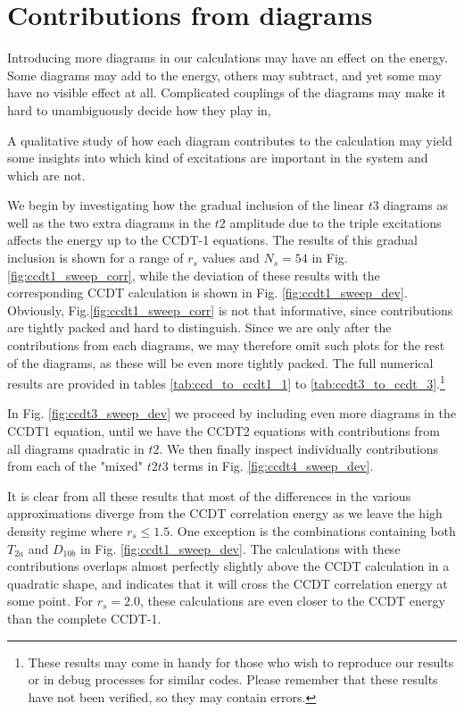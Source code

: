 \FloatBarrier
\section{Contributions from diagrams}

Introducing more diagrams in our calculations may have an effect on the energy. Some diagrams may add to the energy, others may subtract, and yet some may have no visible effect at all. Complicated couplings of the diagrams may make it hard to unambiguously decide how they play in, 

A qualitative study of how each diagram contributes to the calculation may yield some insights into which kind of excitations are important in the system and which are not. 

We begin by investigating how the gradual inclusion of the linear $t3$ diagrams as well as the two extra diagrams in the $t2$ amplitude due to the triple excitations affects the energy up to the CCDT-1 equations. The results of this gradual inclusion is shown for a range of $r_s$ values and $N_s = 54$ in Fig. \ref{fig:ccdt1_sweep_corr}, while the deviation of these results with the corresponding CCDT calculation is shown in Fig. \ref{fig:ccdt1_sweep_dev}. Obviously, Fig.\ref{fig:ccdt1_sweep_corr} is not that informative, since contributions are tightly packed and hard to distinguish. Since we are only after the contributions from each diagrams, we may therefore omit such plots for the rest of the diagrams, as these will be even more tightly packed. The full numerical results are provided in tables \ref{tab:ccd_to_ccdt1_1} to \ref{tab:ccdt3_to_ccdt_3}.\footnote{These results may come in handy for those who wish to reproduce our results or in debug processes for similar codes. Please remember that these results have not been verified, so they may contain errors.}

In Fig. \ref{fig:ccdt3_sweep_dev} we proceed by including even more diagrams in the CCDT1 equation, until we have the CCDT2 equations with contributions from all diagrams quadratic in $t2$. We then finally inspect individually contributions from each of the "mixed" $t2t3$ terms in Fig. \ref{fig:ccdt4_sweep_dev}.

It is clear from all these results that most of the differences in the various approximations diverge from the CCDT correlation energy as we leave the high density regime where $r_s \leq 1.5$. One exception is the combinations containing both $T_{2a}$ and $D_{10b}$ in Fig. \ref{fig:ccdt1_sweep_dev}. The calculations with these contributions overlaps almost perfectly slightly above the CCDT calculation in a quadratic shape, and indicates that it will cross the CCDT correlation energy at some point. For $r_s = 2.0$, these calculations are even closer to the CCDT energy than the complete CCDT-1. 

